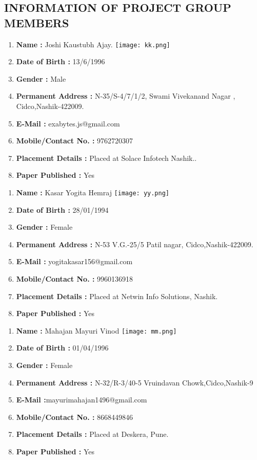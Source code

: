 \documentclass[oneside,a4paper,12pt]{report}
\begin{document}
\begin{appendices}
\begin{itemize}
\chapter{INFORMATION OF PROJECT GROUP MEMBERS}
\newpage
\begin{enumerate}
\item \textbf{Name :} Joshi Kaustubh Ajay.
\hspace{60 mm}\texttt{[image: kk.png]}
\item \textbf{Date of Birth :} 13/6/1996
\item \textbf{Gender :} Male
\item \textbf{Permanent Address : }N-35/S-4/7/1/2, Swami Vivekanand  Nagar , Cidco,Nashik-422009.
\item \textbf{E-Mail :} exabytes.js@gmail.com
\item \textbf{Mobile/Contact No. :} 9762720307
\item \textbf{Placement Details :} Placed at Solace Infotech Nashik..
\item \textbf{Paper Published :} Yes 
\end{enumerate}

\newpage
\begin{enumerate}
\item \textbf{Name :} Kasar  Yogita Hemraj \hspace{60 mm}\texttt{[image: yy.png]}
\item \textbf{Date of Birth :} 28/01/1994
\item \textbf{Gender :} Female
\item \textbf{Permanent Address :} N-53 V.G.-25/5 Patil nagar, Cidco,Nashik-422009.
\item \textbf{E-Mail :} yogitakasar156@gmail.com
\item \textbf{Mobile/Contact No. :} 9960136918
\item \textbf{Placement Details : }Placed at Netwin Info Solutions, Nashik.
\item \textbf{Paper Published :} Yes 
\end{enumerate}

\newpage
\begin{enumerate}
\item \textbf{Name :} Mahajan Mayuri Vinod \hspace{60 mm}\texttt{[image: mm.png]}
\item \textbf{Date of Birth :} 01/04/1996
\item \textbf{Gender :} Female
\item \textbf{Permanent Address :} N-32/R-3/40-5 Vruindavan Chowk,Cidco,Nashik-9
\item \textbf{E-Mail :}mayurimahajan1496@gmail.com
\item \textbf{Mobile/Contact No. :} 8668449846
\item \textbf{Placement Details :} Placed at Deskera, Pune.
\item \textbf{Paper Published :} Yes 



\end{enumerate}
\end{itemize}
\end{appendices}
\end{document}
